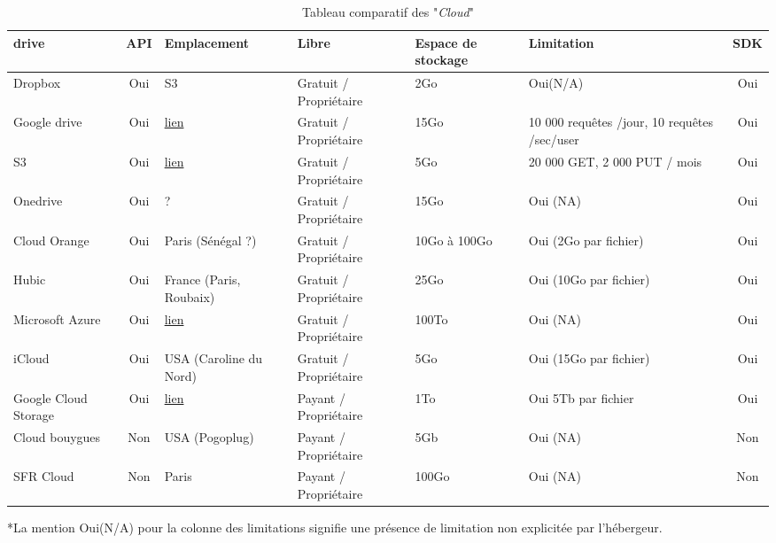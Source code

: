 \documentclass[10pt]{article}
\begin{document}
\begin{table}[!h] \caption{Tableau comparatif des "\textit{Cloud}"}
\renewcommand{\arraystretch}{1.5} \begin{center}
\begin{tabular}{|m{1in}|c|m{1in}|m{1in}|m{1in}|m{1in}|c|} \hline \bf\centering
drive & \bf API & \bf Emplacement & \bf Libre & \bf\centering Espace de stockage
& \bf Limitation & \bf SDK\\ \hline \centering Dropbox & Oui & S3 & Gratuit /
Propriétaire & 2Go & Oui(N/A) & Oui \\ \hline \centering Google drive & Oui  &
\href{http://www.google.com/about/datacenters/inside/locations/index.html}{lien}
& Gratuit / Propriétaire & 15Go & 10 000 requêtes /jour, 10 requêtes /sec/user &
Oui \\ \hline \centering S3 & Oui  &
\href{http://aws.amazon.com/fr/about-aws/global-infrastructure/}{lien} & Gratuit
/ Propriétaire & 5Go & 20 000 GET, 2 000 PUT / mois & Oui \\ \hline \centering
Onedrive & Oui  & ? & Gratuit / Propriétaire & 15Go & Oui (NA) & Oui \\ \hline
\centering Cloud Orange & Oui  & Paris (Sénégal ?) & Gratuit / Propriétaire &
10Go à 100Go & Oui (2Go par fichier) & Oui \\ \hline \centering Hubic & Oui  &
France (Paris, Roubaix) & Gratuit / Propriétaire & 25Go & Oui (10Go par fichier)
& Oui \\ \hline \centering Microsoft Azure & Oui  &
\href{http://azure.microsoft.com/en-us/regions/}{lien} & Gratuit / Propriétaire
& 100To & Oui (NA) & Oui \\ \hline \centering iCloud & Oui  & USA (Caroline du
Nord) & Gratuit / Propriétaire & 5Go & Oui (15Go par fichier) & Oui \\ \hline
\centering Google Cloud Storage & Oui  &
\href{http://www.google.com/about/datacenters/inside/locations/index.html}{lien}
& Payant  / Propriétaire & 1To & Oui 5Tb par fichier & Oui \\ \hline \centering
Cloud bouygues & Non  & USA (Pogoplug) & Payant  / Propriétaire & 5Gb & Oui (NA)
& Non \\ \hline \centering SFR Cloud & Non & Paris & Payant / Propriétaire &
100Go & Oui (NA) & Non \\ \hline \end{tabular} \end{center} \end{table} *La
mention Oui(N/A) pour la colonne des limitations signifie une présence de
limitation non explicitée par l'hébergeur.\\
\end{document}

